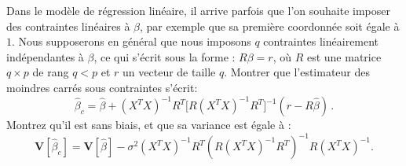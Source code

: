 \documentclass{../headers/td_upc}
\providecommand{\1}{\mathds{1}}
\begin{document}
		Dans le modèle de régression linéaire,
		il arrive parfois que l'on souhaite imposer des contraintes linéaires à $\beta$,
		par exemple que sa première coordonnée soit égale à $1$.
		Nous supposerons en général que nous imposons $q$ contraintes linéairement indépendantes à $\beta$,
		ce qui s'écrit sous la forme : $R \beta=r$,
		où $R$ est une matrice $q \times p$ de rang $q<p$ et $r$ un vecteur de taille $q$.
		Montrer que l'estimateur des moindres carrés sous contraintes s'écrit:
	\[
	\hat \beta_c = \hat \beta + (X^T X)^{-1} R^T  \big[ R (X^T X)^{-1} R^T \big]^{-1} (r - R \hat \beta)\,.
	\]
	Montrez qu'il est sans biais, et que sa variance est égale à :
	\[
		\mathbf{V}[\hat\beta_c] = \mathbf{V}[\hat\beta] - \sigma^2 (X^T X)^{-1} R^T (R (X^T X)^{-1} R^T)^{-1} R (X^T X)^{-1}.
	\]
\end{document}

